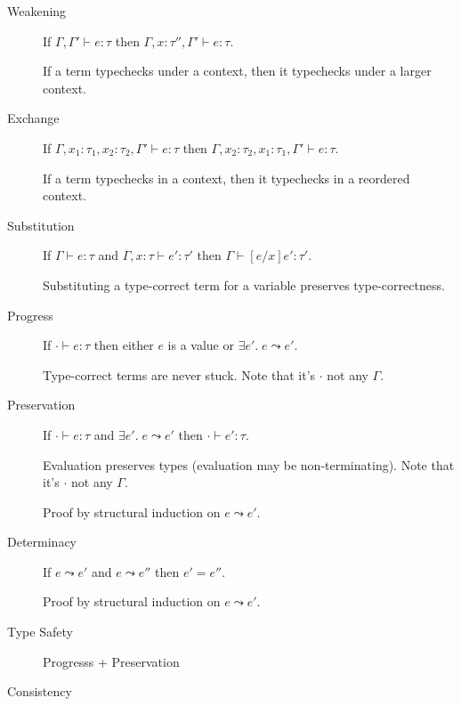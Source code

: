 \documentclass[a4paper,11pt]{article}
\begin{document}
{
    \begin{description}
    \item[Weakening]
    {
        \hfill

        If \(\Gamma,\Gamma' \vdash e : \tau\) then \(\Gamma, x : \tau'', \Gamma' \vdash e : \tau\).

        If a term typechecks under a context, then it typechecks under a larger context.
    }
    \item[Exchange]
    {
        \hfill

        If \(\Gamma, x_1 : \tau_1, x_2 : \tau_2, \Gamma' \vdash e : \tau\) then \(\Gamma, x_2 : \tau_2, x_1 : \tau_1,
        \Gamma' \vdash e : \tau\).

        If a term typechecks in a context, then it typechecks in a reordered context.

    }
    \item[Substitution]
    {
        \hfill
        
        If \(\Gamma \vdash e : \tau\) and \(\Gamma, x : \tau \vdash e' : \tau'\) then \(\Gamma \vdash [e/x]e' : \tau'\).

        Substituting a type-correct term for a variable preserves type-correctness.
    }
    \item[Progress]
    {
        \hfill

        If \(\cdot \vdash e : \tau\) then either \(e\) is a value or \(\exists e'.\; e \leadsto e'\).

        Type-correct terms are never stuck. Note that it's \(\cdot\) not any \(\Gamma\).
    }
    \item[Preservation]
    {
        \hfill

        If \(\cdot \vdash e : \tau\) and \(\exists e'.\; e \leadsto e'\) then \(\cdot \vdash e' : \tau\).

        Evaluation preserves types (evaluation may be non-terminating). Note that it's \(\cdot\) not any \(\Gamma\).

        Proof by structural induction on \(e \leadsto e'\).
    }
    \item[Determinacy]
    {
        \hfill

        If \(e \leadsto e'\) and \(e \leadsto e''\) then \(e' = e''\).
        
        Proof by structural induction on \(e \leadsto e'\).
    }
    \item[Type Safety] Progresss + Preservation
    \item[Consistency]
    {
        \hfill

}
\end{description}}
\end{document}
